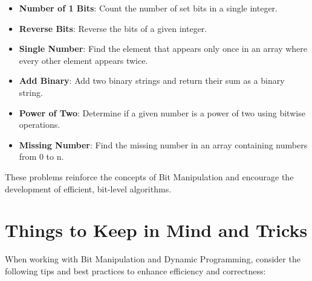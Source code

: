 \begin{itemize}
    \item \textbf{Number of 1 Bits}: Count the number of set bits in a single integer.
    \item \textbf{Reverse Bits}: Reverse the bits of a given integer.
    \item \textbf{Single Number}: Find the element that appears only once in an array where every other element appears twice.
    \item \textbf{Add Binary}: Add two binary strings and return their sum as a binary string.
    \item \textbf{Power of Two}: Determine if a given number is a power of two using bitwise operations.
    \item \textbf{Missing Number}: Find the missing number in an array containing numbers from 0 to n.
\end{itemize}

These problems reinforce the concepts of Bit Manipulation and encourage the development of efficient, bit-level algorithms.

\section*{Things to Keep in Mind and Tricks}

When working with Bit Manipulation and Dynamic Programming, consider the following tips and best practices to enhance efficiency and correctness:

